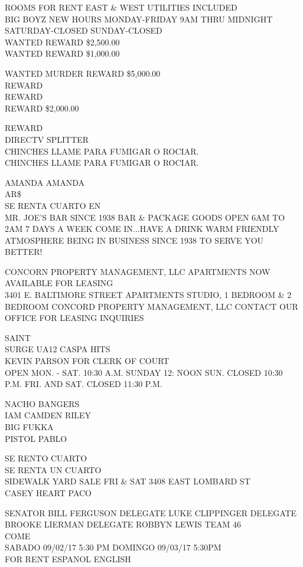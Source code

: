 \documentclass[10pt,letterpaper]{article}
\begin{document}
ROOMS FOR RENT EAST \& WEST UTILITIES INCLUDED\\
BIG BOYZ NEW HOURS MONDAY{-}FRIDAY 9AM THRU MIDNIGHT SATURDAY{-}CLOSED SUNDAY{-}CLOSED\\
WANTED REWARD \$2,500.00\\
WANTED REWARD \$1,000.00

WANTED MURDER REWARD \$5,000.00\\
REWARD\\
REWARD\\
REWARD \$2,000.00

REWARD\\
DIRECTV SPLITTER\\
CHINCHES LLAME PARA FUMIGAR O ROCIAR.\\
CHINCHES LLAME PARA FUMIGAR O ROCIAR.

AMANDA AMANDA\\
AR\$\\
SE RENTA CUARTO EN\\
MR. JOE'S BAR SINCE 1938 BAR \& PACKAGE GOODS OPEN 6AM TO 2AM 7 DAYS A WEEK COME IN...HAVE A DRINK WARM FRIENDLY ATMOSPHERE BEING IN BUSINESS SINCE 1938 TO SERVE YOU BETTER!

CONCORN PROPERTY MANAGEMENT, LLC APARTMENTS NOW AVAILABLE FOR LEASING\\
3401 E. BALTIMORE STREET APARTMENTS STUDIO, 1 BEDROOM \& 2 BEDROOM CONCORD PROPERTY MANAGEMENT, LLC CONTACT OUR OFFICE FOR LEASING INQUIRIES

SAINT\\
SURGE UA12 CASPA HITS\\
KEVIN PARSON FOR CLERK OF COURT\\
OPEN MON. {-} SAT. 10:30 A.M. SUNDAY 12: NOON SUN. CLOSED 10:30 P.M. FRI. AND SAT. CLOSED 11:30 P.M.

NACHO BANGERS\\
IAM CAMDEN RILEY\\
BIG FUKKA\\
PISTOL PABLO

SE RENTO CUARTO\\
SE RENTA UN CUARTO\\
SIDEWALK YARD SALE FRI \& SAT 3408 EAST LOMBARD ST\\
CASEY HEART PACO

SENATOR BILL FERGUSON DELEGATE LUKE CLIPPINGER DELEGATE BROOKE LIERMAN DELEGATE ROBBYN LEWIS TEAM 46\\
COME\\
SABADO 09/02/17 5:30 PM DOMINGO 09/03/17 5:30PM\\
FOR RENT ESPANOL ENGLISH
\end{document}
